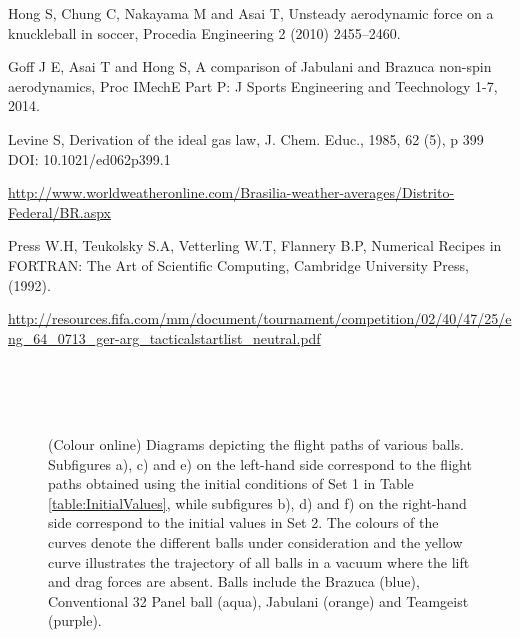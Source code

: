 \documentclass[a4paper]{article}
\begin{document}
\begin{thebibliography}{99}
Hong S, Chung C, Nakayama M and Asai T,  Unsteady aerodynamic force on a knuckleball in soccer, Procedia Engineering 2 (2010) 2455–2460. 

	Goff J E, Asai T and Hong S, A comparison of Jabulani and Brazuca non-spin aerodynamics, Proc IMechE Part P: J Sports Engineering and Teechnology 1-7, 2014.
	
	Levine S, Derivation of the ideal gas law, J. Chem. Educ., 1985, 62 (5), p 399
DOI: 10.1021/ed062p399.1	

\url{http://www.worldweatheronline.com/Brasilia-weather-averages/Distrito-Federal/BR.aspx}

	Press W.H, Teukolsky S.A, Vetterling W.T, Flannery B.P, Numerical Recipes in FORTRAN: The Art of Scientific Computing, Cambridge University Press, (1992).

														   \url{http://resources.fifa.com/mm/document/tournament/competition/02/40/47/25/eng_64_0713_ger-arg_tacticalstartlist_neutral.pdf}

\end{thebibliography}
%
%
\begin{figure}[p!] 
  \begin{center} 
  \captionsetup[subfigure]{width=0.42\textwidth}
  \,\,
   \\
  \,\,
  \\
  \,\,
 \end{center}
\vspace{-0.5cm}
 \caption{(Colour online) Diagrams depicting the flight paths of various balls.  Subfigures a), c) and e) on the left-hand side correspond to the flight paths obtained using the initial conditions of Set 1 in Table \ref{table:InitialValues}, while subfigures b), d) and f) on the right-hand side correspond to the initial values in Set 2.  The colours of the curves denote the different balls under consideration and the yellow curve illustrates the trajectory of all balls in a vacuum where the lift and drag forces are absent.  Balls include the Brazuca (blue), Conventional 32 Panel ball (aqua), Jabulani (orange) and Teamgeist (purple).}
 \label{fig:AllBallsCompare}
\end{figure}
\end{document}

